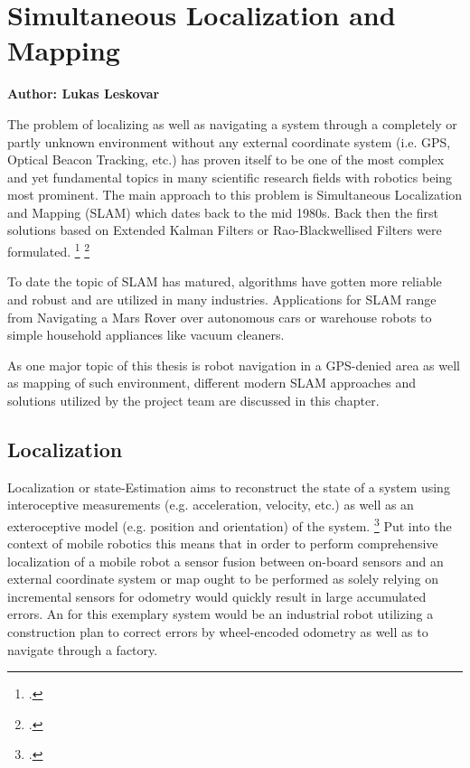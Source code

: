 \chapter{Simultaneous Localization and Mapping}
\label{chapter:slam}

\textbf{Author: Lukas Leskovar} 

The problem of localizing as well as navigating a system through a completely or partly unknown environment without any external coordinate system (i.e. GPS, Optical Beacon Tracking, etc.) has proven itself to be one of the most complex and yet fundamental topics in many scientific research fields with robotics being most prominent. The main approach to this problem is Simultaneous Localization and Mapping (SLAM) which dates back to the mid 1980s. Back then the first solutions based on Extended Kalman Filters or Rao-Blackwellised Filters were formulated. \footcite{durrantSlam2006}  \footcite{cadenaSlamFuture2016}

To date the topic of SLAM has matured, algorithms have gotten more reliable and robust and are utilized in many industries. Applications for SLAM range from Navigating a Mars Rover over autonomous cars or warehouse robots to simple household appliances like vacuum cleaners. 

As one major topic of this thesis is robot navigation in a GPS-denied area as well as mapping of such environment, different modern SLAM approaches and solutions utilized by the project team are discussed in this chapter.

\section{Localization}
Localization or state-Estimation aims to reconstruct the state of a system using interoceptive measurements (e.g. acceleration, velocity, etc.) as well as an exteroceptive model (e.g. position and orientation) of the system. \footcite{barfootStateEstimation2017}
Put into the context of mobile robotics this means that in order to perform comprehensive localization of a mobile robot a sensor fusion between on-board sensors and an external coordinate system or map ought to be performed as solely relying on incremental sensors for odometry would quickly result in large accumulated errors.
An for this exemplary system would be an industrial robot utilizing a construction plan to correct errors by wheel-encoded odometry as well as to navigate through a factory. 

